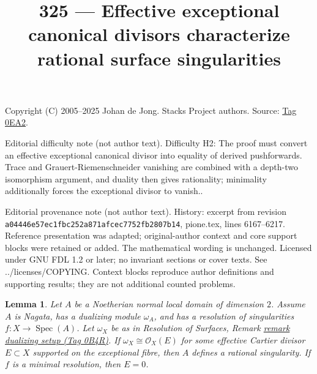 \documentclass{amsart}
\theoremstyle{plain}
\newtheorem{lemma}[subsection]{Lemma}
\theoremstyle{definition}
\theoremstyle{remark}
\numberwithin{equation}{subsection}
\def\Spec{\mathop{\mathrm{Spec}}}
\begin{document}
\title[Stacks Project, Tag 0EA2]{325 --- Effective exceptional canonical divisors characterize rational surface singularities}
\maketitle
\noindent Copyright (C) 2005--2025 Johan de Jong. Stacks Project authors. Source: \href{https://stacks.math.columbia.edu/tag/0EA2}{Tag 0EA2}.

\noindent Editorial difficulty note (not author text). Difficulty H2: The proof must convert an effective exceptional canonical divisor into equality of derived pushforwards. Trace and Grauert-Riemenschneider vanishing are combined with a depth-two isomorphism argument, and duality then gives rationality; minimality additionally forces the exceptional divisor to vanish..

\noindent Editorial provenance note (not author text). History: excerpt from revision \texttt{a0444\allowbreak 6e57e\allowbreak c1fbc\allowbreak 252a8\allowbreak 71afc\allowbreak ec775\allowbreak 2fb28\allowbreak 07b14}, pione.tex, lines 6167--6217. Reference presentation was adapted; original-author context and core support blocks were retained or added. The mathematical wording is unchanged. Licensed under GNU FDL 1.2 or later; no invariant sections or cover texts. See ../licenses/COPYING. Context blocks reproduce author definitions and supporting results; they are not additional counted problems.

\begin{lemma}
\label{lemma-characterize-rational-singularity}
Let $A$ be a Noetherian normal local domain of dimension $2$.
Assume $A$ is Nagata, has a dualizing module $\omega_A$, and has a
resolution of singularities $f : X \to \Spec(A)$.
Let $\omega_X$ be as in Resolution of Surfaces,
Remark \href{https://stacks.math.columbia.edu/tag/0B4R}{remark dualizing setup (Tag 0B4R)}.
If $\omega_X \cong \mathcal{O}_X(E)$ for some effective
Cartier divisor $E \subset X$ supported on the exceptional
fibre, then $A$ defines a rational singularity.
If $f$ is a minimal resolution, then $E = 0$.
\end{lemma}
\end{document}
